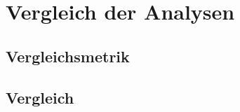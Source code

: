 \chapter{Vergleich der Analysen}
\label{cha:Vergleich der Analysen}
\section{Vergleichsmetrik}
\section{Vergleich}